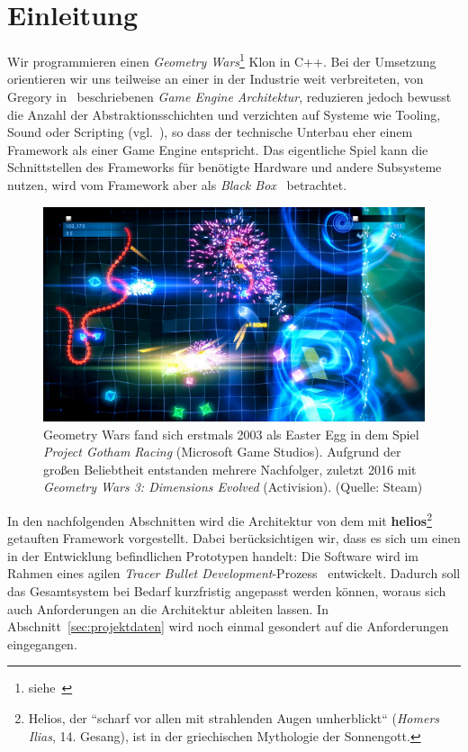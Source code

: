 \section{Einleitung}

Wir programmieren einen \textit{Geometry Wars}\footnote{siehe~\cite[]{WikipediaGeometryWars}} Klon in C++.
Bei der Umsetzung orientieren wir uns teilweise an einer in der Industrie weit verbreiteten, von Gregory in~\cite[]{Gre19} beschriebenen \textit{Game Engine Architektur}, reduzieren jedoch bewusst die Anzahl der Abstraktionsschichten und verzichten auf Systeme wie Tooling, Sound oder Scripting (vgl.~\cite[\textbf{Figure 1.16}, 39]{Gre19}), so dass der technische Unterbau eher einem Framework als einer Game Engine entspricht.
Das eigentliche Spiel kann die Schnittstellen des Frameworks für benötigte Hardware und andere Subsysteme nutzen, wird vom Framework aber als \textit{Black Box}~\cite[]{RB88} betrachtet.\\

\begin{figure}[!h]
    \centering
    \includegraphics[width=1\columnwidth]{img/geometry_wars}
    \caption{Geometry Wars fand sich erstmals 2003 als Easter Egg in dem Spiel \textit{Project Gotham Racing} (Microsoft Game Studios). Aufgrund der großen Beliebtheit entstanden mehrere Nachfolger, zuletzt 2016 mit \textit{Geometry Wars 3: Dimensions Evolved} (Activision). (Quelle: Steam)}
    \label{fig:geometry_wars}
\end{figure}

In den nachfolgenden Abschnitten wird die Architektur von dem mit \textbf{helios}\footnote{
    Helios, der ``scharf vor allen mit strahlenden Augen umherblickt`` (\textit{Homers Ilias}, 14. Gesang), ist in der griechischen Mythologie der Sonnengott.
} getauften Framework vorgestellt.
Dabei berücksichtigen wir, dass es sich um einen in der Entwicklung befindlichen Prototypen handelt:
Die Software wird im Rahmen eines agilen \textit{Tracer Bullet Development}-Prozess~\cite[50 f.]{TH20} entwickelt.
Dadurch soll das Gesamtsystem bei Bedarf kurzfristig angepasst werden können, woraus sich auch Anforderungen an die Architektur ableiten lassen.
In Abschnitt~\ref{sec:projektdaten} wird noch einmal gesondert auf die Anforderungen eingegangen. \\

